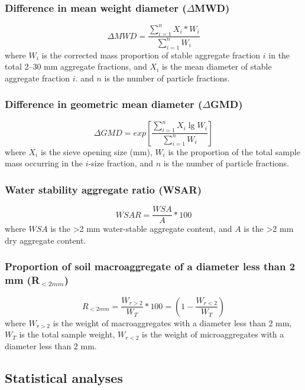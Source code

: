 \subsubsection{Difference in mean weight diameter ($\Delta$MWD)}

    $$\Delta MWD = \frac{\sum_{i=1}^{n} X_i*W_i}{\sum_{i=1}^{n} W_i}$$
    where $W_i$ is the corrected mass proportion of stable aggregate fraction $i$ in the total 2–30 mm aggregate fractions, and $X_i$ is the mean diameter of stable aggregate fraction $i$. and $n$ is the number of particle fractions.

\subsubsection{Difference in geometric mean diameter ($\Delta$GMD)}
    $$\Delta GMD = exp \left[\frac{\sum_{i=1}^{n} X_i\lg W_i}{\sum_{i=1}^{n} W_i}\right]$$
    where $X_i$ is the sieve opening size (mm), $W_i$ is the proportion of the total sample mass occurring in the $i$-size fraction, and $n$ is the number of particle fractions.

\subsubsection{Water stability aggregate ratio (WSAR)}

    $$WSAR = \frac{WSA}{A}*100$$
    where $WSA$ is the >2 mm water-stable aggregate content, and  $A$ is the >2 mm dry aggregate content.

\subsubsection{Proportion of soil macroaggregate of a diameter less than 2 mm (R$_{<2mm}$)}
    $$R_{<2mm}=\frac{W_{r>2}}{W_T}*100 = \left(1-\frac{W_{r<2}}{W_T}\right)$$
    where $W_{r>2}$ is the weight of macroaggregates with a diameter less than 2 mm, $W_T$ is the total sample weight, $W_{r<2}$ is the weight of microaggregates with a diameter less than 2 mm.
    
\subsection{Statistical analyses}

